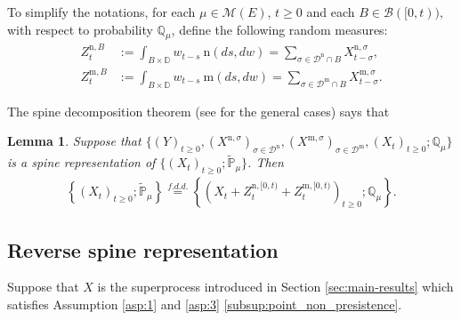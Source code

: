 \documentclass[12pt,a4paper]{amsart}
\numberwithin{equation}{section}
\theoremstyle{plain}
\newtheorem{lem}[thm]{Lemma}
\theoremstyle{definition}
\begin{document}
To simplify the notations, for each $\mu \in \mathcal M(E)$, $t\geq 0$ and each
$B \in \mathscr B([0,t))$, with respect to probability $\mathbb Q_\mu$, define
the following random measures:
\begin{align}
	Z^{\mathrm n,B}_t
	&:= \int_{B\times \mathbb D} w_{t-s} ~\mathrm n (ds,dw)
   = \sum_{\sigma \in \mathcal D^\mathrm n \cap B} X^{\mathrm n,\sigma}_{t-\sigma},
	\\ Z^{\mathrm m,B}_t
	&:= \int_{B\times \mathbb D} w_{t-s} ~\mathrm m (ds,dw)
   = \sum_{\sigma \in \mathcal D^\mathrm m \cap B} X^{\mathrm m,\sigma}_{t-\sigma}.
\end{align}

The spine decomposition theorem (see \cite{RenSongSun2019Spine} for the general
cases) says that
\begin{lem}\label{lem:spine_structure}
	Suppose that $\{(Y)_{t\geq 0}, (X^{\mathrm n, \sigma})_{\sigma\in \mathcal
    D^\mathrm n}, (X^{\mathrm m, \sigma})_{\sigma \in \mathcal D^\mathrm m},
  (X_t)_{t\geq 0}; \mathbb Q_{\mu}\}$ is a spine representation of
  $\{(X_t)_{t\geq 0}; \widetilde {\mathbb P}_\mu\}$. Then
  \begin{align}
    \left\{(X_t)_{t\geq 0}; \widetilde{\mathbb P}_\mu\right\}
    \overset{f.d.d.}{=}
    \left\{ \left(X_t + Z^{\mathrm n, [0,t)}_{t} + Z^{\mathrm m, [0,t)}_{t} \right)_{t\geq 0}; \mathbb Q_\mu \right\}.
  \end{align}
\end{lem}

\subsection{Reverse spine representation}

Suppose that $X$ is the superprocess introduced in Section \ref{sec:main-results} which satisfies Assumption \ref{asp:1} and \ref{asp:3} \eqref{subsup:point_non_presistence}.
\end{document}
